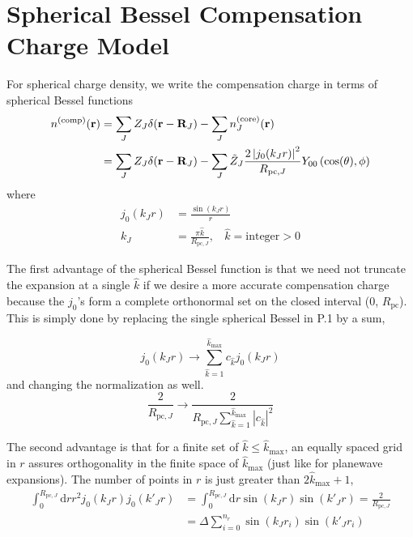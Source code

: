 \documentclass[paper=a4, fontsize=11pt]{article} %
\numberwithin{equation}{section} %
\numberwithin{figure}{section} %
\numberwithin{table}{section} %
\newcommand{\br}{{\bf{r}}}
\newcommand{\bR}{{\bf{R}}}
\newcommand{\rcore}{{\mathrm{core}}}
\newcommand{\rd}{{\mathrm{d}}}
\newcommand{\rcomp}{{\mathrm{comp}}}
\newcommand{\Rpc}{{R_{\mathrm{pc}}}}
\begin{document}
\section{Spherical Bessel Compensation Charge Model}\label{App:SBC}
For spherical charge density, we write the compensation charge in terms of spherical Bessel functions
\begin{equation}
\begin{split}
n^{(\rcomp)}(\br) 
&= \sum_J Z_J\delta(\br-\bR_J) - \sum_J n_J^{(\rcore)}(\br)\\
&= \sum_J Z_J\delta(\br-\bR_J) - \sum_J \tilde Z_J \frac{2 \left|j_0(k_J r)\right|^2}{R_{\mathrm{pc},J}} Y_{00}\left(\cos(\theta),\phi\right)
\end{split}
\end{equation}
where
\begin{equation}
\begin{split}
j_0(k_J r) &= \frac{\sin(k_J r)}{r} \\
k_J &= \frac{\pi \hat {k}}{R_{\mathrm{pc},J}},\ \ \ \ \hat {k} = \mathrm{integer} > 0
\end{split}
\end{equation}

The first advantage of the spherical Bessel function is that we need not truncate the expansion at a single $\hat {k}$ if we desire a more accurate compensation charge because the $j_0$'s form a complete orthonormal set on the closed interval (0, $\Rpc$). This is simply done by replacing the single spherical Bessel in P.1 by a sum, 

\begin{equation}
j_0(k_J r) \rightarrow \sum_{\hat {k} = 1}^{\hat {k}_{\mathrm{max}}} c_{\hat {k}}j_0(k_J r)
\end{equation}
and changing the normalization as well.
\begin{equation}
\frac{2}{R_{\mathrm{pc},J}} \rightarrow \frac{2}{R_{\mathrm{pc},J}\sum_{\hat {k} = 1}^{\hat {k}_{\mathrm{max}}} |c_{\hat {k}}|^2}
\end{equation}

The second advantage is that for a finite set of $\hat {k} \leq \hat {k}_{\mathrm{max}}$, an equally spaced grid in $r$ assures orthogonality in the finite space of $\hat {k}_{\mathrm{max}}$ (just like for planewave expansions). The number of points in $r$ is just greater than $2\hat {k}_{\mathrm{max}} + 1$, 
\begin{equation}
\begin{split}
\int_0^{R_{\mathrm{pc},J}} \rd r r^2 j_0(k_J r) j_0(k'_J r)
&= \int_0^{R_{\mathrm{pc},J}} \rd r \sin(k_J r) \sin(k'_J r) = \frac{2}{R_{\mathrm{pc},J}}\\
&= \Delta \sum_{i=0}^{n_r} \sin(k_J r_i) \sin(k'_J r_i) 
\end{split}
\end{equation}
\end{document}
